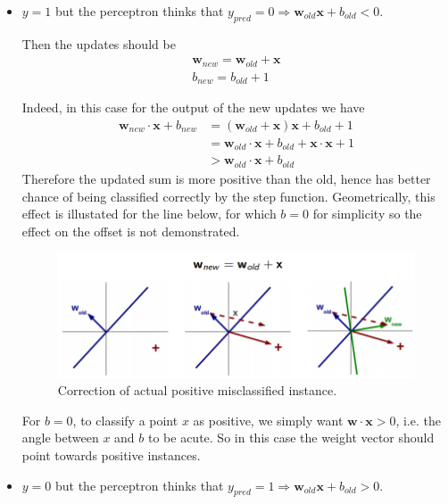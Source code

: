 \documentclass[a4paper]{article}
\begin{document}
\begin{itemize}
    \item $y=1$ but the perceptron thinks that $y_{pred} = 0 \Rightarrow \textbf{w}_{old}\textbf{x} + b_{old} < 0$.
    
    Then the updates should be
        \begin{gather*}
            \textbf{w}_{new} = \textbf{w}_{old} + \textbf{x} \\
            b_{new} = b_{old} + 1
        \end{gather*}
        
    Indeed, in this case for the output of the new updates we have
    \[
    \begin{split}
        \textbf{w}_{new}\cdot \textbf{x} + b_{new} 
        &= \left( \textbf{w}_{old} + \textbf{x} \right)\textbf{x} + b_{old} + 1\\
        &=\textbf{w}_{old}\cdot \textbf{x} + b_{old} + \textbf{x} \cdot \textbf{x} + 1\\
        &>  \textbf{w}_{old}\cdot \textbf{x} + b_{old}
    \end{split}
    \]
    Therefore the updated sum is more positive than the old, hence has better chance of being classified correctly by the step function. Geometrically, this  effect is illustated for the line below, for which $b=0$ for simplicity so the effect on the offset is not demonstrated. 
    \begin{figure}[H]
        \centering
        \includegraphics[scale=0.75]{img/line_pos_correction.PNG}
        \caption{Correction of actual positive misclassified instance.}
    \end{figure}
    For $b=0$, to classify a point $x$ as positive, we simply want $\textbf{w}\cdot \textbf{x}>0$, i.e. the angle between $x$ and $b$ to be acute. So in this case the weight vector should point towards positive instances. 
    
    \item $y=0$ but the perceptron thinks that $y_{pred} = 1 \Rightarrow \textbf{w}_{old}\textbf{x} + b_{old} > 0$. 
    

\end{itemize}
\end{document}
